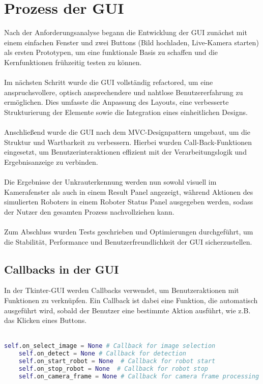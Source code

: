 \documentclass[12pt, a4paper]{scrreprt}
\begin{document}
\section{Prozess der GUI}
Nach der Anforderungsanalyse begann die Entwicklung der GUI zunächst mit einem einfachen Fenster und zwei Buttons (Bild hochladen, Live-Kamera starten) als ersten Prototypen, um eine funktionale Basis zu schaffen und die Kernfunktionen frühzeitig testen zu können.\\
\\
Im nächsten Schritt wurde die GUI vollständig refactored, um eine anspruchsvollere, optisch ansprechendere und nahtlose Benutzererfahrung zu ermöglichen. Dies umfasste die Anpassung des Layouts, eine verbesserte Strukturierung der Elemente sowie die Integration eines einheitlichen Designs.\\
\\
Anschließend wurde die GUI nach dem MVC-Designpattern umgebaut, um die Struktur und Wartbarkeit zu verbessern. Hierbei wurden Call-Back-Funktionen eingesetzt, um Benutzerinteraktionen effizient mit der Verarbeitungslogik und Ergebnisanzeige zu verbinden.\\
\\
Die Ergebnisse der Unkrauterkennung werden nun sowohl visuell im Kamerafenster als auch in einem Result Panel angezeigt, während Aktionen des simulierten Roboters in einem Roboter Status Panel ausgegeben werden, sodass der Nutzer den gesamten Prozess nachvollziehen kann.\\
\\
Zum Abschluss wurden Tests geschrieben und Optimierungen durchgeführt, um die Stabilität, Performance und Benutzerfreundlichkeit der GUI sicherzustellen.\\

\subsection{Callbacks in der GUI}
In der Tkinter-GUI werden Callbacks verwendet, um Benutzeraktionen mit Funktionen zu verknüpfen. Ein Callback ist dabei eine Funktion, die automatisch ausgeführt wird, sobald der Benutzer eine bestimmte Aktion ausführt, wie z.B. das Klicken eines Buttons.\\
\\
\begin{lstlisting}[language=Python, caption=Callback-Definition]
    self.on_select_image = None # Callback for image selection
    self.on_detect = None # Callback for detection
    self.on_start_robot = None  # Callback for robot start
    self.on_stop_robot = None  # Callback for robot stop
    self.on_camera_frame = None # Callback for camera frame processing
\end{lstlisting}
\end{document}
